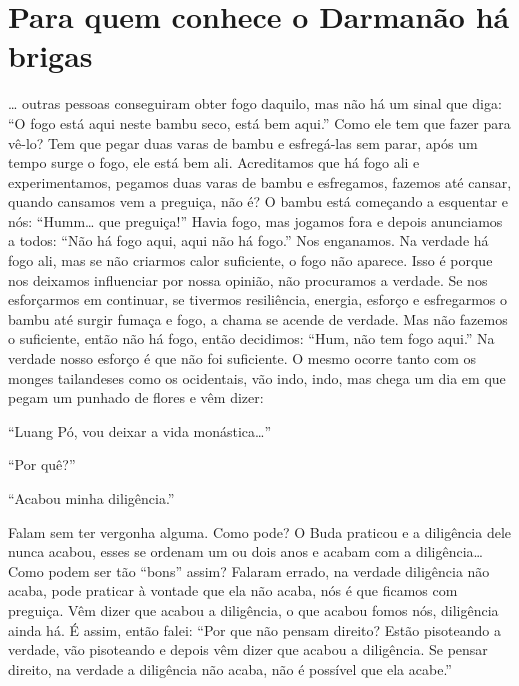 
\chapter[Para quem conhece o Darma não há brigas]{Para quem conhece o Darma\newline não há brigas}
\markright{\theChapterAuthor}

\ldots{} outras pessoas conseguiram obter fogo daquilo, mas não há um
sinal que diga: “O fogo está aqui neste bambu seco, está bem aqui.”
Como ele tem que fazer para vê-lo? Tem que pegar duas varas de bambu e
esfregá-las sem parar, após um tempo surge o fogo, ele está bem ali.
Acreditamos que há fogo ali e experimentamos, pegamos duas varas de
bambu e esfregamos, fazemos até cansar, quando cansamos vem a preguiça,
não é? O bambu está começando a esquentar e nós: “Humm\ldots{} que preguiça!”
Havia fogo, mas jogamos fora e depois anunciamos a todos: “Não há fogo
aqui, aqui não há fogo.” Nos enganamos. Na verdade há fogo ali, mas se
não criarmos calor suficiente, o fogo não aparece. Isso é porque nos
deixamos influenciar por nossa opinião, não procuramos a verdade. Se
nos esforçarmos em continuar, se tivermos resiliência, energia, esforço
e esfregarmos o bambu até surgir fumaça e fogo, a chama se acende de
verdade. Mas não fazemos o suficiente, então não há fogo, então
decidimos: “Hum, não tem fogo aqui.” Na verdade nosso esforço é que não
foi suficiente. O mesmo ocorre tanto com os monges tailandeses como os
ocidentais, vão indo, indo, mas chega um dia em que pegam um punhado de
flores e vêm dizer:

“Luang Pó, vou deixar a vida monástica\ldots{}” 

“Por quê?” 

“Acabou minha diligência.” 

Falam sem ter vergonha alguma. Como pode? O Buda praticou e a
diligência dele nunca acabou, esses se ordenam um ou dois anos e acabam
com a diligência\ldots{} Como podem ser tão “bons” assim? Falaram errado, na
verdade diligência não acaba, pode praticar à vontade que ela não
acaba, nós é que ficamos com preguiça. Vêm dizer que acabou a
diligência, o que acabou fomos nós, diligência ainda há. É assim, então
falei: “Por que não pensam direito? Estão pisoteando a verdade, vão
pisoteando e depois vêm dizer que acabou a diligência. Se pensar
direito, na verdade a diligência não acaba, não é possível que ela
acabe.”

